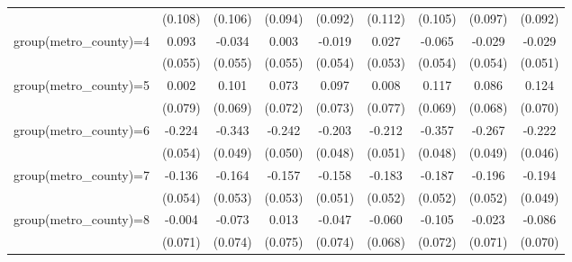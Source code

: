 {\begin{tabular}{l*{8}{c}}
                    &     (0.108)         &     (0.106)         &     (0.094)         &     (0.092)         &     (0.112)         &     (0.105)         &     (0.097)         &     (0.092)         \\
group(metro\_county)=4&       0.093\sym{*}  &      -0.034         &       0.003         &      -0.019         &       0.027         &      -0.065         &      -0.029         &      -0.029         \\
                    &     (0.055)         &     (0.055)         &     (0.055)         &     (0.054)         &     (0.053)         &     (0.054)         &     (0.054)         &     (0.051)         \\
group(metro\_county)=5&       0.002         &       0.101         &       0.073         &       0.097         &       0.008         &       0.117\sym{*}  &       0.086         &       0.124\sym{*}  \\
                    &     (0.079)         &     (0.069)         &     (0.072)         &     (0.073)         &     (0.077)         &     (0.069)         &     (0.068)         &     (0.070)         \\
group(metro\_county)=6&      -0.224\sym{***}&      -0.343\sym{***}&      -0.242\sym{***}&      -0.203\sym{***}&      -0.212\sym{***}&      -0.357\sym{***}&      -0.267\sym{***}&      -0.222\sym{***}\\
                    &     (0.054)         &     (0.049)         &     (0.050)         &     (0.048)         &     (0.051)         &     (0.048)         &     (0.049)         &     (0.046)         \\
group(metro\_county)=7&      -0.136\sym{**} &      -0.164\sym{***}&      -0.157\sym{***}&      -0.158\sym{***}&      -0.183\sym{***}&      -0.187\sym{***}&      -0.196\sym{***}&      -0.194\sym{***}\\
                    &     (0.054)         &     (0.053)         &     (0.053)         &     (0.051)         &     (0.052)         &     (0.052)         &     (0.052)         &     (0.049)         \\
group(metro\_county)=8&      -0.004         &      -0.073         &       0.013         &      -0.047         &      -0.060         &      -0.105         &      -0.023         &      -0.086         \\
                    &     (0.071)         &     (0.074)         &     (0.075)         &     (0.074)         &     (0.068)         &     (0.072)         &     (0.071)         &     (0.070)         \\

\end{tabular}}
